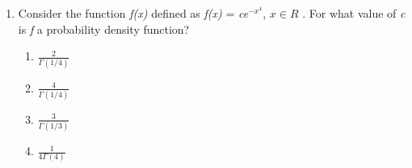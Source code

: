 \renewcommand{\theequation}{\theenumi}
\renewcommand{\thefigure}{\theenumi}
\renewcommand{\thetable}{\theenumi}
\begin{enumerate}[label=\thesection.\arabic*.,ref=\thesection.\theenumi]



\item Consider the function \textit{f(x)} defined as \textit{f(x)} = \textit{ce$^{-x^{4}}$}, $\textit{x} \in R$ . For what value of \textit{c} is \textit{f} a probability density function?\\
\begin{enumerate}
    \item $\displaystyle\frac{2}{\Gamma(1/4)}$\\\label{june/2019/52/option 1}
    \item $\displaystyle\frac{4}{\Gamma(1/4)}$\\
    \item $\displaystyle\frac{3}{\Gamma(1/3)}$\\
    \item $\displaystyle\frac{1}{4\Gamma(4)}$
\end{enumerate}
%
\solution



\end{enumerate}

